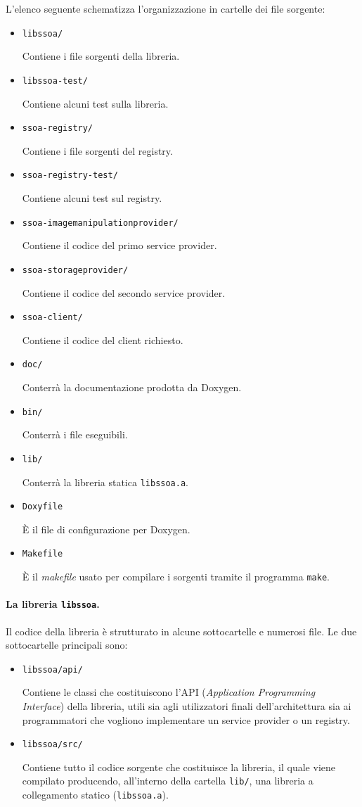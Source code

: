 \documentclass[a4paper,twoside]{article}
\newcommand*\file{\texttt}
\begin{document}
L'elenco seguente schematizza l'organizzazione in cartelle dei file sorgente:
\begin{itemize}
\item \file{libssoa/}\par
Contiene i file sorgenti della libreria.
\item \file{libssoa-test/}\par
Contiene alcuni test sulla libreria.
\item \file{ssoa-registry/}\par
Contiene i file sorgenti del registry.
\item \file{ssoa-registry-test/}\par
Contiene alcuni test sul registry.
\item \file{ssoa-imagemanipulationprovider/}\par
Contiene il codice del primo service provider.
\item \file{ssoa-storageprovider/}\par
Contiene il codice del secondo service provider.
\item \file{ssoa-client/}\par
Contiene il codice del client richiesto.
\item \file{doc/}\par
Conterrà la documentazione prodotta da Doxygen.
\item \file{bin/}\par
Conterrà i file eseguibili.
\item \file{lib/}\par
Conterrà la libreria statica \file{libssoa.a}.
\item \file{Doxyfile}\par
È il file di configurazione per Doxygen.
\item \file{Makefile}\par
È il \emph{makefile} usato per compilare i sorgenti tramite il programma \file{make}.
\end{itemize}

\paragraph{La libreria \file{libssoa}.}
Il codice della libreria è strutturato in alcune sottocartelle e numerosi file. Le due sottocartelle principali sono:
\begin{itemize}
\item \file{libssoa/api/}\par
Contiene le classi che costituiscono l'API (\emph{Application Programming Interface}) della libreria, utili sia agli utilizzatori finali dell'architettura sia ai programmatori che vogliono implementare un service provider o un registry.
\item \file{libssoa/src/}\par
Contiene tutto il codice sorgente che costituisce la libreria, il quale viene compilato producendo, all'interno della cartella \file{lib/}, una libreria a collegamento statico (\file{libssoa.a}).
\end{itemize}
\end{document}
